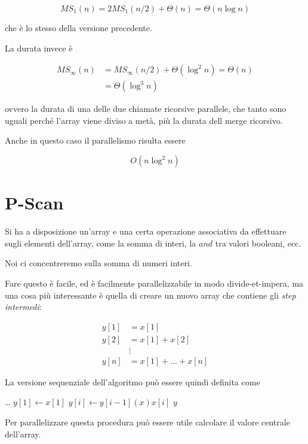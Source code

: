 $$
MS_1(n) = 2 MS_1(n/2) + \Theta(n) = \Theta (n \log n)
$$

che è lo stesso della versione precedente.

La durata invece è

\begin{align*}
MS_\infty (n) &= MS_\infty (n/2) + \Theta(\log^2 n) = \Theta (n) \\
              &=\Theta (\log^3 n)
\end{align*}

ovvero la durata di una delle due chiamate ricorsive parallele, che tanto sono uguali perché l'array viene diviso a metà, più la durata dell merge ricorsivo.

Anche in questo caso il parallelismo risulta essere

$$
O(n \log^2 n)
$$

\section{P-Scan}\label{p-scan}

Si ha a disposizione un'array e una certa operazione associativa da effettuare sugli elementi dell'array, come la somma di interi, la $and$ tra valori booleani, ecc.

Noi ci concentreremo sulla somma di numeri interi.

Fare questo è facile, ed è facilmente parallelizzabile in modo divide-et-impera, ma una cosa più interessante è quella di creare un nuovo array che contiene gli \emph{step intermedi}:

\begin{align*}
y[1] &= x[1] \\
y[2] &= x[1] + x[2] \\
&\vdots \\
y[n] &= x[1] + \ldots + x[n]
\end{align*}

La versione sequenziale dell'algoritmo può essere quindi definita come

\begin{breakablealgorithm}
\begin{algorithmic}[1]
\State \ldots
\State $y[1] \gets x[1]$
    \State $y[i]\gets y[i-1] (x) x[i]$
\EndFor
\State \Return $y$
\EndFunction
\end{algorithmic}
\end{breakablealgorithm}

Per parallelizzare questa procedura può essere utile calcolare il valore centrale dell'array.

